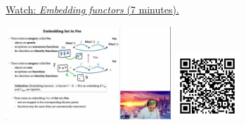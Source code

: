 
\begin{minipage}{10cm}
    \href{https://act4e-spring21.netlify.app/videos/spring2021-functors:semi-and-fun:embedding-fun.html}{Watch: \emph{Embedding functors} (7 minutes).}
        
    \href{https://act4e-spring21.netlify.app/videos/spring2021-functors:semi-and-fun:embedding-fun.html}{\includegraphics[height=3.5cm]{spring2021-functors:semi-and-fun:embedding-fun/thumbnails.jpg}}
    \href{https://act4e-spring21.netlify.app/videos/spring2021-functors:semi-and-fun:embedding-fun.html}{\includegraphics[height=2.5cm]{spring2021-functors:semi-and-fun:embedding-fun/qrcode.png}}
\end{minipage}
